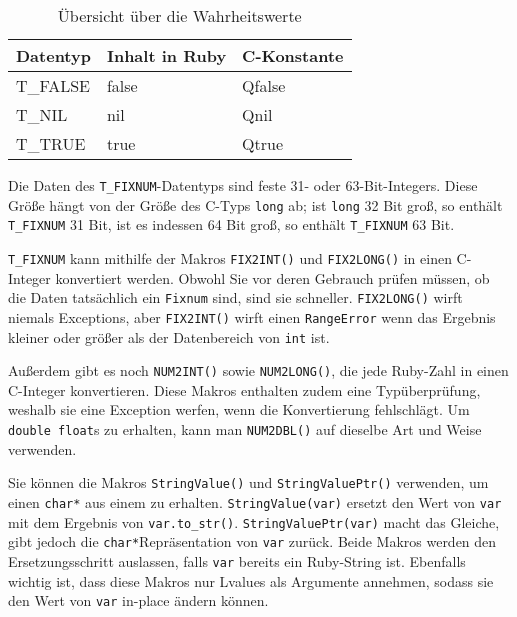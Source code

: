 \begin{table}[btp]
  \centering\ttfamily
  \begin{tabular}{lll}
    \textbf{\rmfamily Datentyp} & \textbf{\rmfamily Inhalt in Ruby} & \textbf{\rmfamily C-Konstante}\\
    \hline
    T\_FALSE & false & Qfalse \\
    T\_NIL   & nil   & Qnil \\
    T\_TRUE  & true  & Qtrue \\
  \end{tabular}
  \caption{Übersicht über die Wahrheitswerte}
  \label{tab:wahrheitswerte}
\end{table}

Die Daten des \verb+T_FIXNUM+-Datentyps sind  feste 31- oder 63-Bit-Integers. Diese Größe
hängt von der Größe des C-Typs \verb+long+ ab; ist \verb+long+ 32 Bit
groß, so enthält \verb+T_FIXNUM+ 31 Bit, ist es indessen 64 Bit groß,
so enthält \verb+T_FIXNUM+ 63 Bit. 

\verb+T_FIXNUM+ kann mithilfe der Makros \verb+FIX2INT()+ und
\verb+FIX2LONG()+ in einen C-Integer konvertiert werden. Obwohl Sie
vor deren Gebrauch prüfen müssen, ob die Daten tatsächlich ein
\verb+Fixnum+ sind, sind sie schneller. \verb+FIX2LONG()+ wirft
niemals Exceptions, aber \verb+FIX2INT()+ wirft einen
\verb+RangeError+ wenn das Ergebnis kleiner oder größer als der
Datenbereich von \verb+int+ ist.

Außerdem gibt es noch \verb+NUM2INT()+ sowie \verb+NUM2LONG()+, die
jede Ruby-Zahl in einen C-Integer konvertieren. Diese Makros enthalten
zudem eine Typüberprüfung, weshalb sie eine Exception werfen, wenn die
Konvertierung fehlschlägt. Um \verb+double float+s zu erhalten, kann
man \verb+NUM2DBL()+ auf dieselbe Art und Weise verwenden.

Sie können die Makros \verb+StringValue()+ und \verb+StringValuePtr()+
verwenden, um einen \verb+char*+ aus einem \VALUE zu erhalten.
\verb+StringValue(var)+ ersetzt den Wert von \verb+var+ mit dem
Ergebnis von \lstinline+var.to_str()+. \verb+StringValuePtr(var)+
macht das Gleiche, gibt jedoch die \verb+char*+\-Re\-prä\-sen\-ta\-tion
von \verb+var+ zurück. Beide Makros werden den Ersetzungsschritt
auslassen, falls \verb+var+ bereits ein Ruby-String ist.  Ebenfalls
wichtig ist, dass diese Makros nur Lvalues als Argumente annehmen,
sodass sie den Wert von \verb+var+ in-place ändern können.

